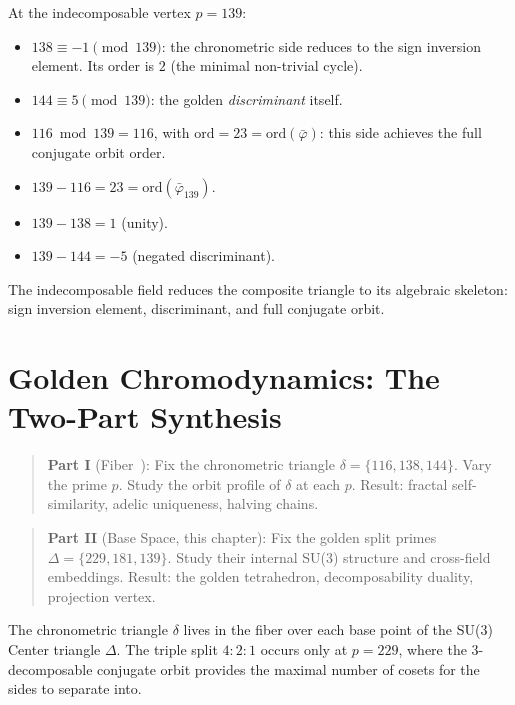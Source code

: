 At the indecomposable vertex $p = 139$:
\begin{itemize}
  \item $138 \equiv -1 \pmod{139}$: the chronometric side reduces to
    the sign inversion element. Its order is $2$ (the minimal non-trivial cycle).
  \item $144 \equiv 5 \pmod{139}$: the golden \emph{discriminant} itself.
  \item $116 \bmod 139 = 116$, with $\mathrm{ord} = 23 = \mathrm{ord}(\bar\varphi)$:
    this side achieves the full conjugate orbit order.
  \item $139 - 116 = 23 = \mathrm{ord}(\bar\varphi_{139})$.
  \item $139 - 138 = 1$ (unity).
  \item $139 - 144 = -5$ (negated discriminant).
\end{itemize}

The indecomposable field reduces the composite triangle to its
algebraic skeleton: sign inversion element, discriminant, and full
conjugate orbit.

\section{Golden Chromodynamics: The Two-Part Synthesis}
\label{sec:synthesis}

\begin{quote}
\textbf{Part I} (Fiber~\cite{dwm_fst}): Fix the chronometric triangle
$\delta = \{116, 138, 144\}$.
Vary the prime $p$. Study the orbit profile of $\delta$ at
each $p$. Result: fractal self-similarity, adelic uniqueness,
halving chains.
\end{quote}

\begin{quote}
\textbf{Part II} (Base Space, this chapter): Fix the golden split primes
$\Delta = \{229, 181, 139\}$.
Study their internal SU(3) structure and cross-field embeddings.
Result: the golden tetrahedron, decomposability duality,
projection vertex.
\end{quote}

The chronometric triangle $\delta$ lives in the fiber over each base point of the SU(3) Center triangle $\Delta$. The triple split $4:2:1$ occurs only at $p = 229$, where the 3-decomposable conjugate orbit provides the maximal number of cosets for the sides to separate into.

